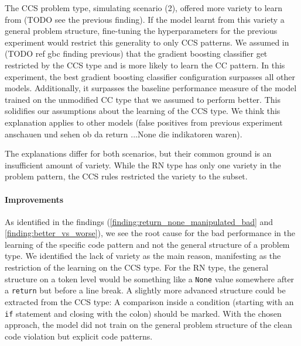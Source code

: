 The CCS problem type, simulating scenario (2), offered more variety to learn from (TODO see the previous finding). If the model learnt from this variety a general problem structure, fine-tuning the hyperparameters for the previous experiment would restrict this generality to only CCS patterns. We assumed in (TODO ref gbc finding previous) that the gradient boosting classifier get restricted by the CCS type and is more likely to learn the CC pattern. In this experiment, the best gradient boosting classifier configuration surpasses all other models. Additionally, it surpasses the baseline performance measure of the model trained on the unmodified CC type that we assumed to perform better. This solidifies our assumptions about the learning of the CCS type. We think this explanation applies to other models (false positives from previous experiment anschauen und sehen ob da return ...None die indikatoren waren).

The explanations differ for both scenarios, but their common ground is an insufficient amount of variety. While the RN type has only one variety in the problem pattern, the CCS rules restricted the variety to the subset.

\paragraph{Improvements}
As identified in the findings (\ref{finding:return_none_manipulated_bad} and \ref{finding:better_vs_worse}), we see the root cause for the bad performance in the learning of the specific code pattern and not the general structure of a problem type. We identified the lack of variety as the main reason, manifesting as the restriction of the learning on the CCS type. For the RN type, the general structure on a token level would be something like a \texttt{None} value somewhere after a \texttt{return} but before a line break. A slightly more advanced structure could be extracted from the CCS type: A comparison inside a condition (starting with an \texttt{if} statement and closing with the colon) should be marked. With the chosen approach, the model did not train on the general problem structure of the clean code violation but explicit code patterns. 

